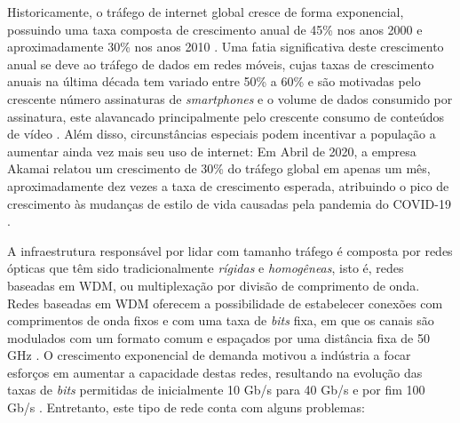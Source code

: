 

Historicamente, o tráfego de internet global cresce de forma exponencial, possuindo uma taxa composta de crescimento anual de 45\% nos anos 2000 \cite{network_evolution_2020} e aproximadamente 30\% nos anos 2010 \cite{cisco2011cisco, cisco2012cisco, cisco2013cisco, cisco2014cisco, cisco2015cisco, cisco2016cisco, cisco2017cisco, cisco2018cisco}. Uma fatia significativa deste crescimento anual se deve ao tráfego de dados em redes móveis, cujas taxas de crescimento anuais na última década tem variado entre 50\% a 60\% e são motivadas pelo crescente número assinaturas de \textit{smartphones} e o volume de dados consumido por assinatura, este alavancado principalmente pelo crescente consumo de conteúdos de vídeo \cite{ericsson_mobility_report_2020}. Além disso, circunstâncias especiais podem incentivar a população a aumentar ainda vez mais seu uso de internet: Em Abril de 2020, a empresa Akamai relatou um crescimento de 30\% do tráfego global em apenas um mês, aproximadamente dez vezes a taxa de crescimento esperada, atribuindo o pico de crescimento às mudanças de estilo de vida causadas pela pandemia do COVID-19 \cite{mckeay_2020}.

A infraestrutura responsável por lidar com tamanho tráfego é composta por redes ópticas que têm sido tradicionalmente \textit{rígidas} e \textit{homogêneas}, isto é, redes baseadas em \acrfull{WDM}, ou multiplexação por divisão de comprimento de onda. Redes baseadas em WDM oferecem a possibilidade de estabelecer conexões com comprimentos de onda fixos e com uma taxa de \textit{bits} fixa, em que os canais são modulados com um formato comum e espaçados por uma distância fixa de 50 GHz \cite{eon_tutorial_2014, jinno_eon_benefits}. O crescimento exponencial de demanda motivou a indústria a focar esforços em aumentar a capacidade destas redes, resultando na evolução das taxas de \textit{bits} permitidas de inicialmente 10 Gb/s para 40 Gb/s e por fim 100 Gb/s \cite{vizcaino_eon_energy}. Entretanto, este tipo de rede conta com alguns problemas:

